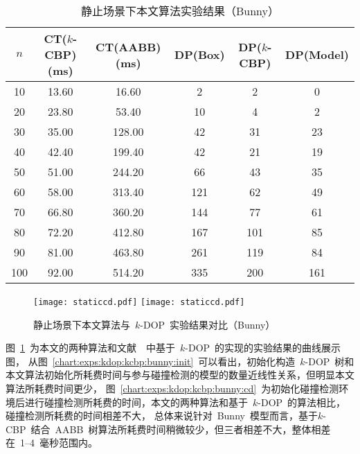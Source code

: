 \begin{table}[htbp]  
\centering
\caption{静止场景下本文算法实验结果（Bunny）}
\label{tab:exp:bunny:k24:kdop:kcbp:detail}
\begin{tabular}{cccccc}
\toprule[1.5pt]
$n$ & CT($k$-CBP)(ms) &  CT(AABB)(ms) & DP(Box) & DP($k$-CBP) & DP(Model)\\
\midrule[1.0pt]
10 &  13.60 &	16.60      & 2   &2   & 0  \\
20 &  23.80 &	53.40      & 10  &4   & 2  \\
30 &  35.00 &	128.00     & 42  &31  & 23 \\
40 &  42.40 &	199.40     & 42  &21  & 19 \\
50 &  51.00 &	244.20     & 66  &43  & 35 \\
60 &  58.00 &	313.40     & 121 &62  & 49 \\
70 &  66.80 &	360.20     & 144 &77  & 61 \\
80 &  72.20 &	412.80     & 167 &101 & 85 \\
90 &  81.00 &	463.80     & 261 &119 & 84 \\
100&  92.00 &	514.20     & 335 &200 & 161\\
\bottomrule[1.5pt]
\end{tabular}
\end{table}

\begin{figure}[!ht] 
\centering
{}
{
    \texttt{[image: staticcd.pdf]}
}
\hspace{1em}
{  
   \texttt{[image: staticcd.pdf]}
}
\caption{静止场景下本文算法与~$k$-DOP~实验结果对比（Bunny）}
\label{chart:exps:kdop:kcbp:bunny}
\end{figure}

图~\ref{chart:exps:kdop:kcbp:bunny}~为本文的两种算法和文献~~中基于~$k$-DOP~的实现的实验结果的曲线展示图，
从图~\ref{chart:exps:kdop:kcbp:bunny:init}~可以看出，初始化构造~$k$-DOP~树和本文算法初始化所耗费时间与参与碰撞检测的模型的数量近线性关系，但明显本文算法所耗费时间更少，
图~\ref{chart:exps:kdop:kcbp:bunny:cd}~为初始化碰撞检测环境后进行碰撞检测所耗费的时间，本文的两种算法和基于~$k$-DOP~的算法相比，碰撞检测所耗费的时间相差不大，
总体来说针对~Bunny~模型而言，基于$k$-CBP~结合~AABB~树算法所耗费时间稍微较少，但三者相差不大，整体相差在~1--4~毫秒范围内。

